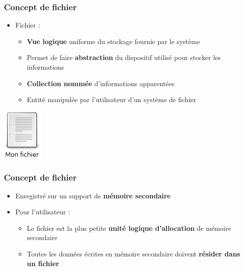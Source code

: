 \begin{frame}
\frametitle{Concept de fichier}
\begin{itemize}
\item Fichier :
\begin{itemize}
\item \textbf{Vue logique} uniforme du stockage fournie par le système
\item Permet de faire \textbf{abstraction} du dispositif utilisé pour stocker les informations
\item \textbf{Collection nommée} d'informations apparentées
\item Entité manipulée par l'utilisateur d'un système de fichier
\end{itemize}
\end{itemize}
\includegraphics[scale=.5]{../illustration/fichier.png}
\end{frame}

\begin{frame}
\frametitle{Concept de fichier}
\begin{itemize}
\item Enregistré sur un support de \textbf{mémoire secondaire}
\item Pour l'utilisateur :
\begin{itemize}
\item Le fichier est la plus petite \textbf{unité logique d'allocation} de mémoire secondaire
\item Toutes les données écrites en mémoire secondaire doivent \textbf{résider dans un fichier}
\end{itemize}
\end{itemize}
\end{frame}

